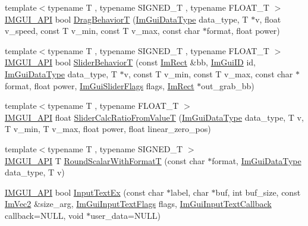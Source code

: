 \begin{DoxyCompactItemize}
{\footnotesize template$<$typename T , typename S\+I\+G\+N\+E\+D\+\_\+T , typename F\+L\+O\+A\+T\+\_\+T $>$ }\\\mbox{\hyperlink{imgui_8h_a43829975e84e45d1149597467a14bbf5}{I\+M\+G\+U\+I\+\_\+\+A\+PI}} bool \mbox{\hyperlink{namespace_im_gui_a36170175bcdad063eff30717dae91108}{Drag\+BehaviorT}} (\mbox{\hyperlink{imgui_8h_a4cfa8697a3d76722fff83eb18922e9d5}{Im\+Gui\+Data\+Type}} data\+\_\+type, T $\ast$v, float v\+\_\+speed, const T v\+\_\+min, const T v\+\_\+max, const char $\ast$format, float power)
\item 
{\footnotesize template$<$typename T , typename S\+I\+G\+N\+E\+D\+\_\+T , typename F\+L\+O\+A\+T\+\_\+T $>$ }\\\mbox{\hyperlink{imgui_8h_a43829975e84e45d1149597467a14bbf5}{I\+M\+G\+U\+I\+\_\+\+A\+PI}} bool \mbox{\hyperlink{namespace_im_gui_ab9dee3b5cb6249c0929f90ed0647bd8b}{Slider\+BehaviorT}} (const \mbox{\hyperlink{struct_im_rect}{Im\+Rect}} \&bb, \mbox{\hyperlink{imgui_8h_a1785c9b6f4e16406764a85f32582236f}{Im\+Gui\+ID}} id, \mbox{\hyperlink{imgui_8h_a4cfa8697a3d76722fff83eb18922e9d5}{Im\+Gui\+Data\+Type}} data\+\_\+type, T $\ast$v, const T v\+\_\+min, const T v\+\_\+max, const char $\ast$format, float power, \mbox{\hyperlink{imgui__internal_8h_a50cc3e3e4beb155e2186f8c1dc057e18}{Im\+Gui\+Slider\+Flags}} flags, \mbox{\hyperlink{struct_im_rect}{Im\+Rect}} $\ast$out\+\_\+grab\+\_\+bb)
\item 
{\footnotesize template$<$typename T , typename F\+L\+O\+A\+T\+\_\+T $>$ }\\\mbox{\hyperlink{imgui_8h_a43829975e84e45d1149597467a14bbf5}{I\+M\+G\+U\+I\+\_\+\+A\+PI}} float \mbox{\hyperlink{namespace_im_gui_adbcf6e29a3059e11aebe37d89cc77991}{Slider\+Calc\+Ratio\+From\+ValueT}} (\mbox{\hyperlink{imgui_8h_a4cfa8697a3d76722fff83eb18922e9d5}{Im\+Gui\+Data\+Type}} data\+\_\+type, T v, T v\+\_\+min, T v\+\_\+max, float power, float linear\+\_\+zero\+\_\+pos)
\item 
{\footnotesize template$<$typename T , typename S\+I\+G\+N\+E\+D\+\_\+T $>$ }\\\mbox{\hyperlink{imgui_8h_a43829975e84e45d1149597467a14bbf5}{I\+M\+G\+U\+I\+\_\+\+A\+PI}} T \mbox{\hyperlink{namespace_im_gui_ad10f0dd923775bac3903666a2751f08a}{Round\+Scalar\+With\+FormatT}} (const char $\ast$format, \mbox{\hyperlink{imgui_8h_a4cfa8697a3d76722fff83eb18922e9d5}{Im\+Gui\+Data\+Type}} data\+\_\+type, T v)
\item 
\mbox{\hyperlink{imgui_8h_a43829975e84e45d1149597467a14bbf5}{I\+M\+G\+U\+I\+\_\+\+A\+PI}} bool \mbox{\hyperlink{namespace_im_gui_acc8cda7bb7c80b9dd36bc394723d1606}{Input\+Text\+Ex}} (const char $\ast$label, char $\ast$buf, int buf\+\_\+size, const \mbox{\hyperlink{struct_im_vec2}{Im\+Vec2}} \&size\+\_\+arg, \mbox{\hyperlink{imgui_8h_a7d2c6153a6b9b5d3178ce82434ac9fb8}{Im\+Gui\+Input\+Text\+Flags}} flags, \mbox{\hyperlink{imgui_8h_a65fd2b568a62c9aa2a28a8a13eb65ad7}{Im\+Gui\+Input\+Text\+Callback}} callback=N\+U\+LL, void $\ast$user\+\_\+data=N\+U\+LL)

\end{DoxyCompactItemize}
